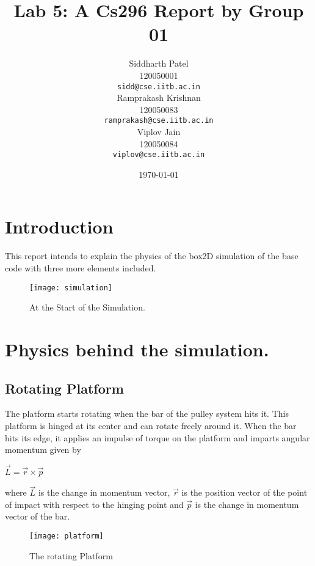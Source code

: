 \documentclass{article}
\begin{document}
\title{Lab 5: A Cs296 Report by Group 01}
\author{Siddharth Patel\\
  120050001\\
  \texttt{sidd@cse.iitb.ac.in}\\
  Ramprakash Krishnan\\
  120050083\\
  \texttt{ramprakash@cse.iitb.ac.in}\\
  Viplov Jain\\
  120050084\\
  \texttt{viplov@cse.iitb.ac.in}\\}
\date{\today}
\maketitle


\section{Introduction}
This report intends to explain the physics of the box2D simulation of the base code with three more elements included.
\begin{figure}[h!] 
\centering 
\texttt{[image: simulation]} 
\caption{At the Start of the Simulation.} 
\end{figure}

\section{Physics behind the simulation.}
\subsection{Rotating Platform}
The platform starts rotating when the bar of the pulley system hits it\cite{wikir}.
This platform is hinged at its center and can rotate freely around it.
When the bar hits its edge, it applies an impulse of torque\cite{wikir} on the platform and imparts angular momentum\cite{wikil} given by
\begin{center}
 $\vec{L} = \vec{r} \times \vec{p}$
\end{center}
\cite{resnick,univ,wikil}
where $\vec{L}$ is the change in momentum vector, $\vec{r}$ is the position vector of the point of impact with respect to the hinging point and $\vec{p}$ is the change in momentum vector of the bar.
\begin{figure}[h!] 
\centering 
\texttt{[image: platform]} 
\caption{The rotating Platform} 
\end{figure}
\end{document}
